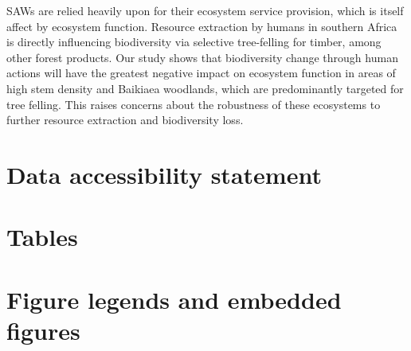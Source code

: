 \documentclass[11pt,a4paper]{article}
\begin{document}
SAWs are relied heavily upon for their ecosystem service provision, which is itself affect by ecosystem function. Resource extraction by humans in southern Africa is directly influencing biodiversity via selective tree-felling for timber, among other forest products. Our study shows that biodiversity change through human actions will have the greatest negative impact on ecosystem function in areas of high stem density and Baikiaea woodlands, which are predominantly targeted for tree felling. This raises concerns about the robustness of these ecosystems to further resource extraction and biodiversity loss.




\newpage{}
\appendix{}

\section{Data accessibility statement}

\section{Tables}

\section{Figure legends and embedded figures}
\end{document}
